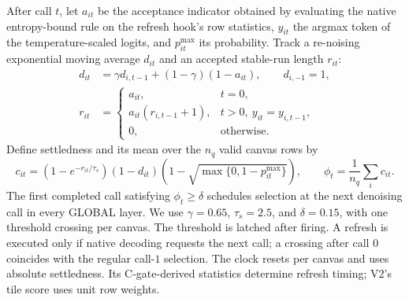 After call $t$, let $a_{it}$ be the acceptance indicator obtained by
evaluating the native entropy-bound rule on the refresh hook's row statistics,
$y_{it}$ the argmax token of the temperature-scaled logits, and
$p_{it}^{\max}$ its probability. Track a re-noising exponential moving
average $d_{it}$ and an accepted stable-run length $r_{it}$:
\begin{align}
 d_{it}&=\gamma d_{i,t-1}+(1-\gamma)(1-a_{it}),
          \qquad d_{i,-1}=1, \label{eq:v2-renoise}\\
 r_{it}&=
 \begin{cases}
   a_{it}, & t=0,\\
   a_{it}(r_{i,t-1}+1), & t>0,\ y_{it}=y_{i,t-1},\\
   0, & \text{otherwise}.
 \end{cases}
 \label{eq:v2-run}
\end{align}
Define settledness and its mean over the $n_q$ valid canvas rows by
\begin{equation}
 c_{it}=\left(1-e^{-r_{it}/\tau_s}\right)(1-d_{it})
        \left(1-\sqrt{\max\{0,1-p_{it}^{\max}\}}\right),
 \qquad \phi_t=\frac{1}{n_q}\sum_i c_{it}.
 \label{eq:v2-progress}
\end{equation}
The first completed call satisfying $\phi_t\ge\delta$ schedules selection
at the next denoising call in every GLOBAL layer. We use $\gamma=0.65$,
$\tau_s=2.5$, and $\delta=0.15$, with one threshold crossing per canvas.
The threshold is latched after firing. A refresh is executed only if native
decoding requests the next call; a crossing after call $0$ coincides with
the regular call-$1$ selection. The clock resets per canvas and uses
absolute settledness. Its C-gate-derived statistics determine refresh timing;
V2's tile score uses unit row weights.

